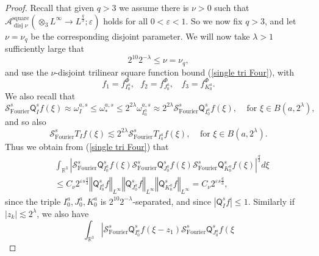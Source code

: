 \documentclass{amsart}%
\theoremstyle{plain}
\numberwithin{equation}{section}
\begin{document}
\begin{proof}
Recall that given $q>3$ we assume there is $\nu>0$ such that $\mathcal{A}%
_{\operatorname*{disj}\nu}^{\operatorname*{square}}\left(  \otimes
_{3}L^{\infty}\rightarrow L^{\frac{q}{3}};\varepsilon\right)  $ holds for all
$0<\varepsilon<1$. So we now fix $q>3$, and let $\nu=\nu_{q}$ be the
corresponding disjoint parameter. We will now take $\lambda>1$ sufficiently
large that
\begin{equation}
2^{10}2^{-\lambda}\leq\nu=\nu_{q}, \label{q control}%
\end{equation}
and use the $\nu$-disjoint trilinear square function bound
(\ref{single tri Four}), with
\[
f_{1}=f_{I_{0}^{a}}^{\Phi},\ \ \ f_{2}=f_{J_{0}^{a}}^{\Phi},\ \ \ \ f_{3}%
=f_{K_{0}^{a}}^{\Phi}.
\]
We also recall that
\[
\mathcal{S}_{\operatorname*{Fourier}}^{s}\mathsf{Q}_{I}^{s}f\left(
\xi\right)  \approx\omega_{I}^{a,s}\leq\omega_{\ast}^{a,s}\leq2^{2\lambda
}\omega_{I_{0}^{a}}^{a,s}\approx2^{2\lambda}\mathcal{S}%
_{\operatorname*{Fourier}}^{s}\mathsf{Q}_{I_{0}^{a}}^{s}f\left(  \xi\right)
,\ \ \ \ \ \text{for }\xi\in B\left(  a,2^{\lambda}\right)  ,
\]
and so also%
\[
\mathcal{S}_{\operatorname*{Fourier}}^{s}T_{I}f\left(  \xi\right)
\lesssim2^{2\lambda}\mathcal{S}_{\operatorname*{Fourier}}^{s}T_{I_{0}^{a}%
}f\left(  \xi\right)  ,\ \ \ \ \ \text{for }\xi\in B\left(  a,2^{\lambda
}\right)  .
\]
Thus we obtain from (\ref{single tri Four}) that%
\begin{align*}
&  \int_{\mathbb{R}^{3}}\left\vert \mathcal{S}_{\operatorname*{Fourier}}%
^{s}\mathsf{Q}_{I_{0}^{a}}^{s}f\left(  \xi\right)  \mathcal{S}%
_{\operatorname*{Fourier}}^{s}\mathsf{Q}_{J_{0}^{a}}^{s}f\left(  \xi\right)
\mathcal{S}_{\operatorname*{Fourier}}^{s}\mathsf{Q}_{K_{0}^{a}}^{s}f\left(
\xi\right)  \right\vert ^{\frac{q}{3}}d\xi\\
&  \leq C_{\nu}2^{\varepsilon s\frac{q}{3}}\left\Vert \mathsf{Q}_{I_{0}^{a}%
}^{s}f\right\Vert _{L^{\infty}}\left\Vert \mathsf{Q}_{J_{0}^{a}}%
^{s}f\right\Vert _{L^{\infty}}\left\Vert \mathsf{Q}_{K_{0}^{a}}^{s}%
f\right\Vert _{L^{\infty}}=C_{\nu}2^{\varepsilon s\frac{q}{3}},
\end{align*}
since the triple $I_{0}^{a},J_{0}^{a},K_{0}^{a}$ is $2^{10}2^{-\lambda}%
$-separated, and since $\left\vert \mathsf{Q}_{I}^{s}f\right\vert \leq1$.
Similarly if $\left\vert z_{k}\right\vert \lesssim2^{\lambda}$, we also have%
\begin{equation}
\int_{\mathbb{R}^{3}}\left\vert \mathcal{S}_{\operatorname*{Fourier}}%
^{s}\mathsf{Q}_{I_{0}^{a}}^{s}f\left(  \xi-z_{1}\right)  \mathcal{S}%
_{\operatorname*{Fourier}}^{s}\mathsf{Q}_{J_{0}^{a}}^{s}f\left(  \xi

\end{equation}
\end{proof}
\end{document}
